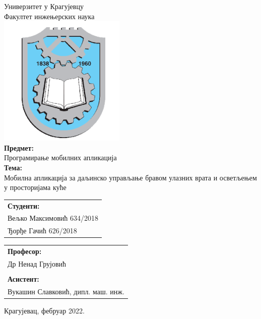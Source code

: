 \documentclass[12pt]{article}
\begin{document}
\thispagestyle{empty}
\begin{center}
\Large{
Универзитет у Крагујевцу
\vspace{0.3cm}\\
Факултет инжењерских наука
}
\vspace{0.7cm}\\
\includegraphics{images/fin_image}
\vspace{0.7cm}\\
\LARGE{
\textbf{Предмет:}
\vspace{0.1cm}\\
Програмирање мобилних апликација
}
\vspace{1cm}\\
\LARGE{
\textbf{Тема:}
\vspace{0.1cm}\\
Мобилна апликација за даљинско управљање бравом улазних врата и осветљењем у просторијама куће
}
\vspace{2cm}
\end{center}

\begin{tabular}{l}
\textbf{Студенти:}\\
Вељко Максимовић 634/2018\\
Ђорђе Гачић 626/2018\\
\end{tabular}
\setlength{\tabcolsep}{12em}
\begin{tabular}{l}
\textbf{Професор:}\\
Др Ненад Грујовић\\
\vspace{0.02cm}\\
\textbf{Асистент:}\\
Вукашин Славковић, дипл. маш. инж.\\
\end{tabular}
\begin{center}
\vspace{1cm}
Крагујевац, фебруар 2022.
\end{center}
\newpage
\end{document}
